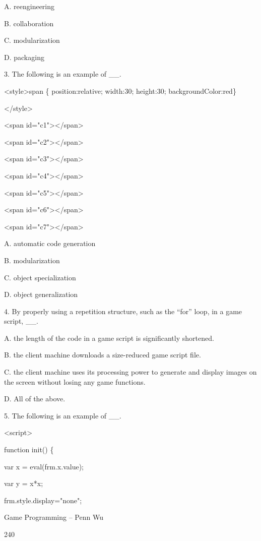 \documentclass[
]{article}
\begin{document}
A. reengineering

B. collaboration

C. modularization

D. packaging

3. The following is an example of \_\_.

\textless style\textgreater span \{ position:relative; width:30;
height:30; backgroundColor:red\}

\textless/style\textgreater{}

\textless span id="c1"\textgreater\textless/span\textgreater{}

\textless span id="c2"\textgreater\textless/span\textgreater{}

\textless span id="c3"\textgreater\textless/span\textgreater{}

\textless span id="c4"\textgreater\textless/span\textgreater{}

\textless span id="c5"\textgreater\textless/span\textgreater{}

\textless span id="c6"\textgreater\textless/span\textgreater{}

\textless span id="c7"\textgreater\textless/span\textgreater{}

A. automatic code generation

B. modularization

C. object specialization

D. object generalization

4. By properly using a repetition structure, such as the ``for'' loop,
in a game script, \_\_.

A. the length of the code in a game script is significantly shortened.

B. the client machine downloads a size-reduced game script file.

C. the client machine uses its processing power to generate and display
images on the screen without losing any game functions.

D. All of the above.

5. The following is an example of \_\_.

\textless script\textgreater{}

function init() \{

var x = eval(frm.x.value);

var y = x*x;

frm.style.display="none";

Game Programming -- Penn Wu

240
\end{document}
